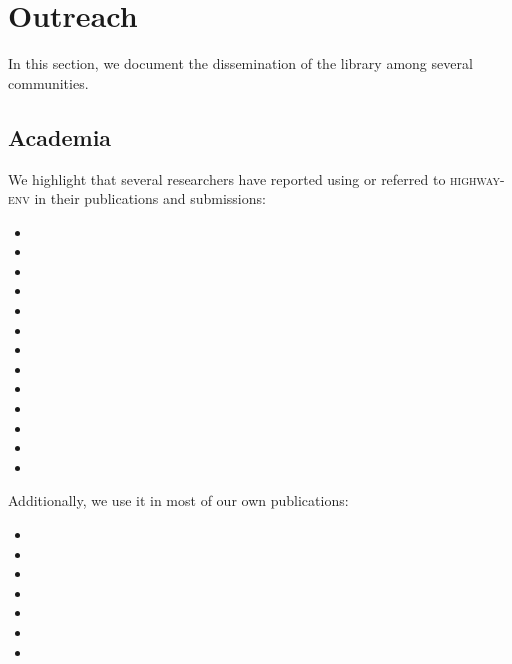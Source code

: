 \section{Outreach}
\label{sec:outreach}
In this section, we document the dissemination of the library among several communities.

\subsection{Academia}

We highlight that several researchers have reported using or referred to \textsc{highway-env} in their publications and submissions:
\begin{itemize}
	\item {}
	\item {}
	\item {}
	\item {}
	\item {}
	\item {}
	\item {}
	\item {}
	\item {}
	\item {}
	\item {}
	\item {}
	\item {}
\end{itemize}

\leavevmode\newline
Additionally, we use it in most of our own publications:
\begin{itemize}
	\item {}
	\item {}
	\item {}
	\item {}
	\item {}
	\item {}
	\item {}
\end{itemize}

